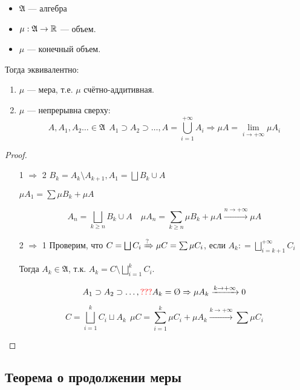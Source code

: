 \begin{theorem}\itemfix
    \begin{itemize}
        \item \(\mathfrak{A}\) --- алгебра
        \item \(\mu : \mathfrak{A} \to \mathbb{R}\) --- объем.
        \item \(\mu\) --- конечный объем.
    \end{itemize}

    Тогда эквивалентно:
    \begin{enumerate}
        \item \(\mu\) --- мера, т.е. \(\mu\) счётно-аддитивная.
        \item \(\mu\) --- непрерывна сверху:
              \[A, A_1, A_2\dots \in \mathfrak{A} \ \ A_1 \supset A_2 \supset \dots , A = \bigcup_{i = 1}^{ +\infty} A_i \Rightarrow \mu A = \lim_{i\to +\infty} \mu A_i\]
    \end{enumerate}
\end{theorem}

\begin{proof}\itemfix
    \begin{enumerate}
        \item [1 \(\Rightarrow\) 2] \(B_k = A_k \setminus A_{k + 1}, A_1 = \bigsqcup B_k \cup A\)

              \(\mu A_1 = \sum \mu B_k + \mu A\)

              \[A_n = \bigsqcup\limits_{k \ge n} B_k \cup A \quad \mu A_n = \sum_{k\ge n} \mu B_k + \mu A \xrightarrow{n\to +\infty} \mu A\]
        \item [2 \(\Rightarrow\) 1] Проверим, что \(C = \bigsqcup C_i \xRightarrow{?} \mu C = \sum \mu C_i\), если \(A_k : = \bigsqcup_{i = k + 1}^{ +\infty} C_i\)

              Тогда \(A_k \in \mathfrak{A}\), т.к. \(A_k = C \setminus \bigsqcup\limits_{i = 1}^k C_i\).

              \[A_1\supset A_2\supset \dots , \? A_k = \text{\O} \Rightarrow \mu A_k \xrightarrow{k\to+\infty} 0\]

              \[C = \bigsqcup_{i = 1}^k C_i \sqcup A_k \ \ \mu C = \sum_{i = 1}^k \mu C_i + \mu A_k \xrightarrow{k\to +\infty} \sum \mu C_i\]
    \end{enumerate}
\end{proof}

\subsection*{Теорема о продолжении меры}

